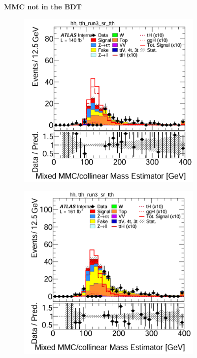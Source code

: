 \begin{figure}[htbp]
\begin{subfigure}[t]{0.45\textwidth}
  \end{subfigure}

  \vspace{0.2cm}
  \begin{minipage}{\textwidth}
    \centering
    \small {\textbf{MMC not in the BDT}}
  \end{minipage}

  \vspace{0.5cm}

  \begin{subfigure}[t]{0.45\textwidth}
    \centering
    \includegraphics[width=\linewidth]{images/mmc_th_tth/run_2_w_mmc_tth.png}
  \end{subfigure}
  \hfill
  \begin{subfigure}[t]{0.45\textwidth}
    \centering
    \includegraphics[width=\linewidth]{images/mmc_th_tth/run_3_w_mmc_tth.png}

\end{subfigure}
\end{figure}
